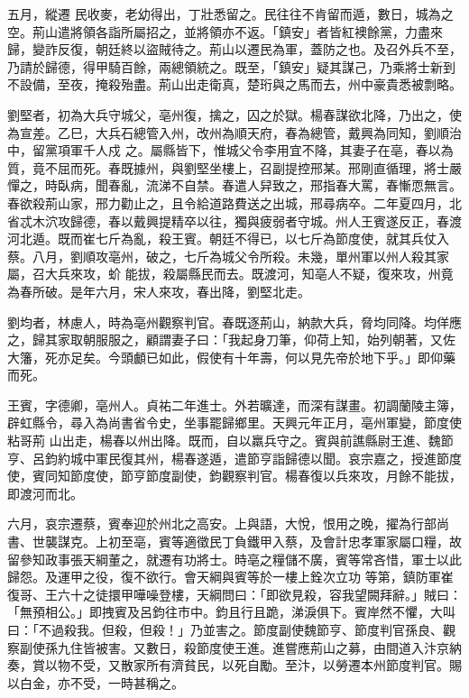 \begin{pinyinscope}
 五月，縱遷
 民收麥，老幼得出，丁壯悉留之。民往往不肯留而遁，數日，城為之空。荊山遣將領各詣所屬招之，並將領亦不返。「鎮安」者皆紅襖餘黨，力盡來歸，變詐反復，朝廷終以盜賊待之。荊山以遷民為軍，蓋防之也。及召外兵不至，乃請於歸德，得甲騎百餘，兩總領統之。既至，「鎮安」疑其謀己，乃乘將士新到不設備，至夜，掩殺殆盡。荊山出走衛真，楚珩與之馬而去，州中豪貴悉被剽略。



 劉堅者，初為大兵守城父，亳州復，擒之，囚之於獄。楊春謀欲北降，乃出之，使為宣差。乙巳，大兵石總管入州，改州為順天府，春為總管，戴興為同知，劉順治中，留黨項軍千人戍
 之。屬縣皆下，惟城父令李用宜不降，其妻子在亳，春以為質，竟不屈而死。春既據州，與劉堅坐樓上，召副提控邢某。邢剛直循理，將士嚴憚之，時臥病，聞春亂，流涕不自禁。春遣人舁致之，邢指春大罵，春慚恧無言。春欲殺荊山家，邢力勸止之，且令給道路費送之出城，邢尋病卒。二年夏四月，北省忒木泬攻歸德，春以戴興提精卒以往，獨與疲弱者守城。州人王賓遂反正，春渡河北遁。既而崔七斤為亂，殺王賓。朝廷不得已，以七斤為節度使，就其兵仗入蔡。八月，劉順攻亳州，破之，七斤為城父令所殺。未幾，單州軍以州人殺其家屬，召大兵來攻，蚧
 能拔，殺屬縣民而去。既渡河，知亳人不疑，復來攻，州竟為春所破。是年六月，宋人來攻，春出降，劉堅北走。



 劉均者，林慮人，時為亳州觀察判官。春既逐荊山，納款大兵，脅均同降。均佯應之，歸其家取朝服服之，顧謂妻子曰：「我起身刀筆，仰荷上知，始列朝著，又佐大籓，死亦足矣。今頭顱已如此，假使有十年壽，何以見先帝於地下乎。」即仰藥而死。



 王賓，字德卿，亳州人。貞祐二年進士。外若曠達，而深有謀畫。初調蘭陵主簿，辟虹縣令，尋入為尚書省令史，坐事罷歸鄉里。天興元年正月，亳州軍變，節度使粘哥荊
 山出走，楊春以州出降。既而，自以羸兵守之。賓與前譙縣尉王進、魏節亨、呂鈞約城中軍民復其州，楊春遂遁，遣節亨詣歸德以聞。哀宗嘉之，授進節度使，賓同知節度使，節亨節度副使，鈞觀察判官。楊春復以兵來攻，月餘不能拔，即渡河而北。



 六月，哀宗遷蔡，賓奉迎於州北之高安。上與語，大悅，恨用之晚，擢為行部尚書、世襲謀克。上初至亳，賓等適徵民丁負鐵甲入蔡，及會計忠孝軍家屬口糧，故留參知政事張天綱董之，就遷有功將士。時亳之糧儲不廣，賓等常吝惜，軍士以此歸怨。及運甲之役，復不欲行。會天綱與賓等於一樓上銓次立功
 等第，鎮防軍崔復哥、王六十之徒擐甲嘩噪登樓，天綱問曰：「即欲見殺，容我望闕拜辭。」賊曰：「無預相公。」即拽賓及呂鈞往市中。鈞且行且跪，涕淚俱下。賓岸然不懼，大叫曰：「不過殺我。但殺，但殺！」乃並害之。節度副使魏節亨、節度判官孫良、觀察副使孫九住皆被害。又數日，殺節度使王進。進嘗應荊山之募，由間道入汴京納奏，賞以物不受，又散家所有濟貧民，以死自勵。至汴，以勞遷本州節度判官。賜以白金，亦不受，一時甚稱之。




\end{pinyinscope}
